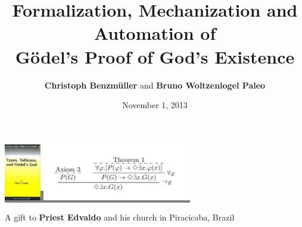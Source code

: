 \documentclass[9pt,mathserif]{beamer}
\title[On G\"{o}del's Proof of God's
Existence]{Formalization, Mechanization and Automation of \\ G\"{o}del's
  Proof of God's Existence}
\author{\textbf{Christoph Benzm\"{u}ller} and \textbf{Bruno Woltzenlogel Paleo}}
\date[1.11.2013]{November 1, 2013}
\begin{document}
\begin{frame}
  \titlepage
\colorbox{gray}{\includegraphics[height=2.5cm]{Images/Books/buch7.jpg} }
\hfill
\colorbox{gray}{\includegraphics[height=2.5cm]{Images/ND.png}}

\hfill \begin{footnotesize}A gift to \textbf{Priest Edvaldo} and his church in Piracicaba, Brazil\end{footnotesize}
\end{frame}














\end{document}

